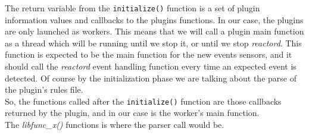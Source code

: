 The return variable from the \texttt{initialize()} function is a set of plugin information values and callbacks to the plugins functions.
In our case, the plugins are only launched as workers. This means that we will call a plugin main function as a thread which will be 
running until we stop it, or until we stop \emph{reactord}. This function is expected to be the main function for the new events 
sensors, and it should call the \emph{reactord} event handling function every time an expected event is detected. Of course by the 
initialization phase we are talking about the parse of the plugin's rules file.\\
So, the functions called after the \texttt{initialize()} function are those callbacks returned by the plugin, and in our case is the 
worker's main function.\\
The \emph{libfunc\_x()} functions is where the parser call would be.

